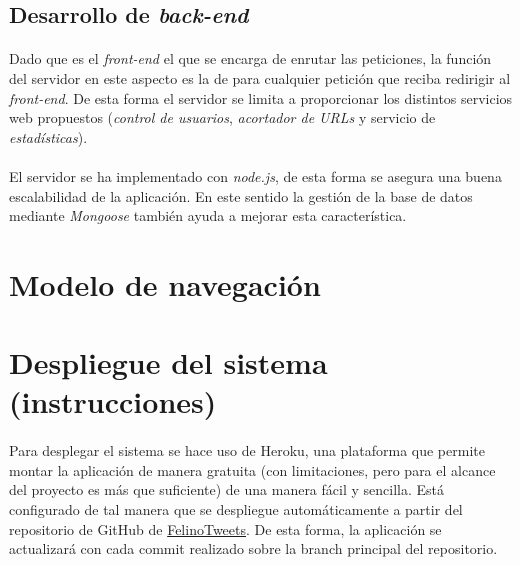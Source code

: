 \documentclass[a4paper]{article}
\begin{document}
	\subsection{Desarrollo de \textit{back-end}}
	
		\paragraph{} Dado que es el \textit{front-end} el que se encarga de enrutar las peticiones, la función del servidor en este aspecto es la de para cualquier petición que reciba redirigir al \textit{front-end}. De esta forma el servidor se limita a proporcionar los distintos servicios web propuestos (\textit{control de usuarios}, \textit{acortador de URLs} y servicio de \textit{estadísticas}).
		
		\paragraph{} El servidor se ha implementado con \textit{node.js}, de esta forma se asegura una buena escalabilidad de la aplicación. En este sentido la gestión de la base de datos mediante \textit{Mongoose} también ayuda a mejorar esta característica.
		
\section{Modelo de navegación}

\section{Despliegue del sistema (instrucciones)}
\paragraph{}Para desplegar el sistema se hace uso de Heroku, una plataforma que permite montar la aplicación de manera gratuita (con limitaciones, pero para el alcance del proyecto es más que suficiente) de una manera fácil y sencilla. Está configurado de tal manera que se despliegue automáticamente a partir del repositorio de GitHub de \href{https://github.com/FelinoSoft/FelinoTweets}{FelinoTweets}. De esta forma, la aplicación se actualizará con cada commit realizado sobre la branch principal del repositorio.
\end{document}
